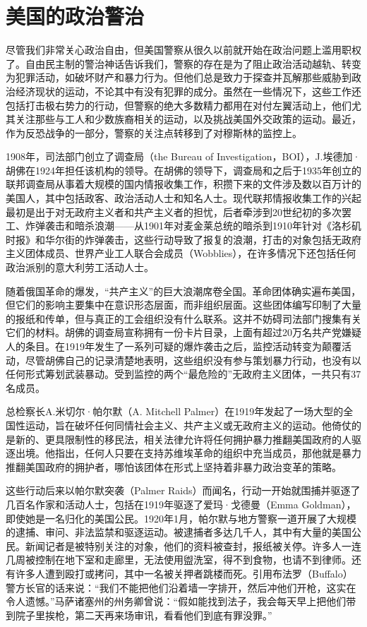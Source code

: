 \documentclass[fontset=fandol, a4paper, 12pt, openright]{ctexbook}
\begin{document}
\section{美国的政治警治}

尽管我们非常关心政治自由，但美国警察从很久以前就开始在政治问题上滥用职权了。自由民主制的警治神话告诉我们，警察的存在是为了阻止政治活动越轨、转变为犯罪活动，如破坏财产和暴力行为。但他们总是致力于探查并瓦解那些威胁到政治经济现状的运动，不论其中有没有犯罪的成分。虽然在一些情况下，这些工作还包括打击极右势力的行动，但警察的绝大多数精力都用在对付左翼活动上，他们尤其关注那些与工人和少数族裔相关的运动，以及挑战美国外交政策的运动。最近，作为反恐战争的一部分，警察的关注点转移到了对穆斯林的监控上。

1908年，司法部门创立了调查局（the Bureau of Investigation，BOI），J.埃德加·胡佛在1924年担任该机构的领导。在胡佛的领导下，调查局和之后于1935年创立的联邦调查局从事着大规模的国内情报收集工作，积攒下来的文件涉及数以百万计的美国人，其中包括政客、政治活动人士和知名人士。现代联邦情报收集工作的兴起最初是出于对无政府主义者和共产主义者的担忧，后者牵涉到20世纪初的多次罢工、炸弹袭击和暗杀浪潮——从1901年对麦金莱总统的暗杀到1910年针对《洛杉矶时报》和华尔街的炸弹袭击，这些行动导致了报复的浪潮，打击的对象包括无政府主义团体成员、世界产业工人联合会成员（Wobblies），在许多情况下还包括任何政治派别的意大利劳工活动人士。

随着俄国革命的爆发，“共产主义”的巨大浪潮席卷全国。革命团体确实遍布美国，但它们的影响主要集中在意识形态层面，而非组织层面。这些团体编写印制了大量的报纸和传单，但与真正的工会组织没有什么联系。这并不妨碍司法部门搜集有关它们的材料。胡佛的调查局宣称拥有一份卡片目录，上面有超过20万名共产党嫌疑人的条目。在1919年发生了一系列可疑的爆炸袭击之后，监控活动转变为颠覆活动，尽管胡佛自己的记录清楚地表明，这些组织没有参与策划暴力行动，也没有以任何形式筹划武装暴动。受到监控的两个“最危险的”无政府主义团体，一共只有37名成员。

总检察长A.米切尔·帕尔默（A. Mitchell Palmer）在1919年发起了一场大型的全国性运动，旨在破坏任何同情社会主义、共产主义或无政府主义的运动。他倚仗的是新的、更具限制性的移民法，相关法律允许将任何拥护暴力推翻美国政府的人驱逐出境。他指出，任何人只要在支持苏维埃革命的组织中充当成员，那他就是暴力推翻美国政府的拥护者，哪怕该团体在形式上坚持着非暴力政治变革的策略。

这些行动后来以帕尔默突袭（Palmer Raids）而闻名，行动一开始就围捕并驱逐了几百名作家和活动人士，包括在1919年驱逐了爱玛·戈德曼（Emma Goldman），即使她是一名归化的美国公民。1920年1月，帕尔默与地方警察一道开展了大规模的逮捕、审问、非法监禁和驱逐运动。被逮捕者多达几千人，其中有大量的美国公民。新闻记者是被特别关注的对象，他们的资料被查封，报纸被关停。许多人一连几周被控制在地下室和走廊里，无法使用盥洗室，得不到食物，也请不到律师。还有许多人遭到殴打或拷问，其中一名被关押者跳楼而死。引用布法罗（Buffalo）警方长官的话来说：“我们不能把他们沿着墙一字排开，然后冲他们开枪，这实在令人遗憾。”马萨诸塞州的州务卿曾说：“假如能找到法子，我会每天早上把他们带到院子里挨枪，第二天再来场审讯，看看他们到底有罪没罪。”
\end{document}
